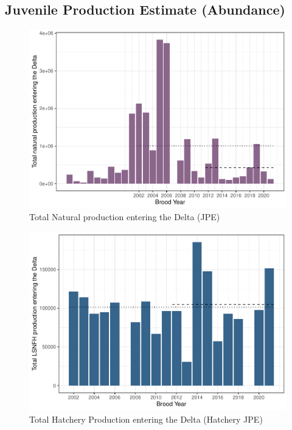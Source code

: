 \documentclass[
]{book}
\theoremstyle{definition}
\theoremstyle{definition}
\theoremstyle{definition}
\theoremstyle{definition}
\theoremstyle{remark}
\begin{document}
\hypertarget{juvenile-production-estimate-abundance}{%
\subsection{Juvenile Production Estimate (Abundance)}\label{juvenile-production-estimate-abundance}}

\begin{figure}
\centering
\includegraphics{_main_files/figure-latex/jpe-fig-1.pdf}
\caption{\label{fig:jpe-fig}Total Natural production entering the Delta (JPE)}
\end{figure}

\begin{figure}
\centering
\includegraphics{_main_files/figure-latex/jpeH-fig-1.pdf}
\caption{\label{fig:jpeH-fig}Total Hatchery Production entering the Delta (Hatchery JPE)}
\end{figure}
\end{document}
